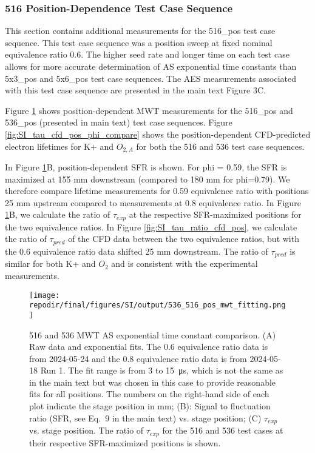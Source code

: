 \clearpage
\subsubsection{516 Position-Dependence Test Case Sequence}

This section contains additional measurements for the 516\_pos test case sequence. This test case sequence was a position sweep at fixed nominal equivalence ratio 0.6. The higher seed rate and longer time on each test case allows for more accurate determination of AS exponential time constants than 5x3\_pos and 5x6\_pos test case sequences. The AES measurements associated with this test case sequence are presented in the main text Figure 3C. 

Figure \ref{fig:SI_536_516_pos_mwt_fitting} shows position-dependent MWT measurements for the 516\_pos and 536\_pos (presented in main text) test case sequences. Figure \ref{fig:SI_tau_cfd_pos_phi_compare} shows the position-dependent CFD-predicted electron lifetimes for K+ and $O_{2,A}$ for both the 516 and 536 test case sequences. 

In Figure \ref{fig:SI_536_516_pos_mwt_fitting}B, position-dependent SFR is shown. For phi = 0.59, the SFR is maximized at 155 mm downstream (compared to 180 mm for phi=0.79). We therefore compare lifetime measurements for 0.59 equivalence ratio with positions 25 mm upstream compared to measurements at 0.8 equivalence ratio. In Figure \ref{fig:SI_536_516_pos_mwt_fitting}B, we calculate the ratio of $\tau_{exp}$ at the respective SFR-maximized positions for the two equivalence ratios. In Figure \ref{fig:SI_tau_ratio_cfd_pos}, we calculate the ratio of $\tau_{pred}$ of the CFD data between the two equivalence ratios, but with the 0.6 equivalence ratio data shifted 25 mm downstream. The ratio of $\tau_{pred}$ is similar for both K+ and $O_2$ and is consistent with the experimental measurements.

\begin{figure}[]
\centering
\texttt{[image: \\repodir/final/figures/SI/output/536\_516\_pos\_mwt\_fitting.png]}
\caption{516 and 536 MWT AS exponential time constant comparison. (A) Raw data and exponential fits. The 0.6 equivalence ratio data is from 2024-05-24 and the 0.8 equivalence ratio data is from 2024-05-18 Run 1. The fit range is from 3 to \SI{15} {\micro \second}, which is not the same as in the main text but was chosen in this case to provide reasonable fits for all positions. The numbers on the right-hand side of each plot indicate the stage position in mm; (B): Signal to fluctuation ratio (SFR, see Eq.\ 9 in the main text) vs. stage position; (C) $\tau_{exp}$ vs. stage position. The ratio of $\tau_{exp}$ for the 516 and 536 test cases at their respective SFR-maximized positions is shown.} 
\label{fig:SI_536_516_pos_mwt_fitting}
\end{figure}

